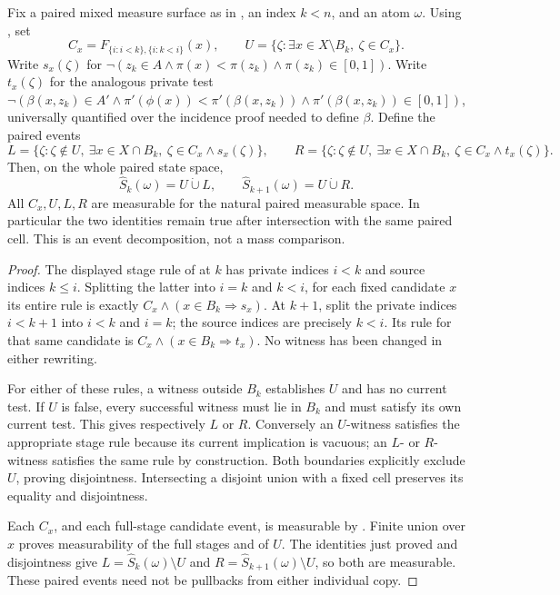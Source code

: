 \begin{helper}
Fix a paired mixed measure surface as in
, an index
\(k<n\), and an atom \(\omega\). Using
, set
\[
 C_x=F_{\{i:i<k\},\{i:k<i\}}(x),\qquad
 U=\{\zeta:\exists x\in X\setminus B_k,\ \zeta\in C_x\}.
\]
Write \(s_x(\zeta)\) for
\(\neg(z_k\in A\land\pi(x)<\pi(z_k)\land\pi(z_k)\in[0,1])\).
Write \(t_x(\zeta)\) for the analogous private test
\(\neg(\beta(x,z_k)\in A'\land
\pi'(\phi(x))<\pi'(\beta(x,z_k))\land\pi'(\beta(x,z_k))\in[0,1])\),
universally quantified over the incidence proof needed to define \(\beta\).
Define the paired events
\[
 L=\{\zeta:\zeta\notin U,\ \exists x\in X\cap B_k,\
       \zeta\in C_x\land s_x(\zeta)\},\qquad
 R=\{\zeta:\zeta\notin U,\ \exists x\in X\cap B_k,\
       \zeta\in C_x\land t_x(\zeta)\}.
\]
Then, on the whole paired state space,
\[
 \widehat S_k(\omega)=U\mathbin{\dot\cup}L,\qquad
 \widehat S_{k+1}(\omega)=U\mathbin{\dot\cup}R.
\]
All \(C_x,U,L,R\) are measurable for the natural paired measurable space.
In particular the two identities remain true after intersection with the
same paired cell. This is an event decomposition, not a mass comparison.
\end{helper}
\begin{proof}
The displayed stage rule of
 at \(k\)
has private indices \(i<k\) and source indices \(k\le i\). Splitting the
latter into \(i=k\) and \(k<i\), for each fixed candidate \(x\) its entire
rule is exactly \(C_x\land(x\in B_k\Rightarrow s_x)\).
At \(k+1\), split the private indices \(i<k+1\) into \(i<k\) and \(i=k\);
the source indices are precisely \(k<i\). Its rule for that same candidate
is \(C_x\land(x\in B_k\Rightarrow t_x)\). No witness has been changed in
either rewriting.

For either of these rules, a witness outside \(B_k\) establishes \(U\) and
has no current test. If \(U\) is false, every successful witness must lie in
\(B_k\) and must satisfy its own current test. This gives respectively
\(L\) or \(R\). Conversely an \(U\)-witness satisfies the appropriate stage
rule because its current implication is vacuous; an \(L\)- or \(R\)-witness
satisfies the same rule by construction. Both boundaries explicitly exclude
\(U\), proving disjointness. Intersecting a disjoint union with a fixed cell
preserves its equality and disjointness.

Each \(C_x\), and each full-stage candidate event, is measurable by
.
Finite union over \(x\) proves measurability of the full stages and of
\(U\). The identities just proved and disjointness give
\(L=\widehat S_k(\omega)\setminus U\) and
\(R=\widehat S_{k+1}(\omega)\setminus U\), so both are measurable.
These paired events need not be pullbacks from either individual copy.
\end{proof}
